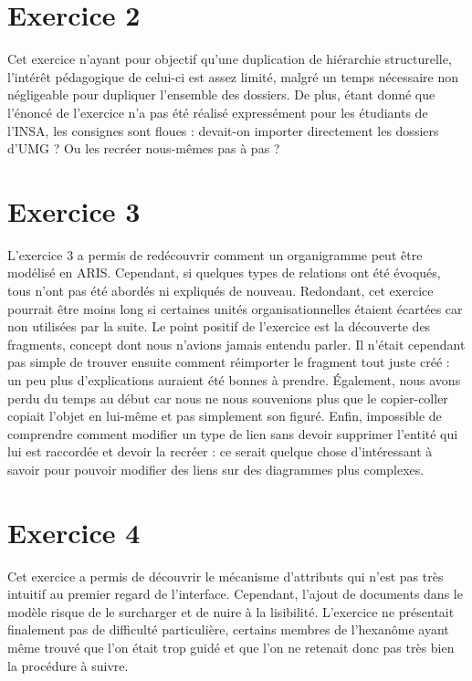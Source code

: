 \section{Exercice 2}

Cet exercice n'ayant pour objectif qu'une duplication de hiérarchie structurelle, l'intérêt pédagogique de celui-ci est assez limité, malgré un temps nécessaire non négligeable pour dupliquer l'ensemble des dossiers. De plus, étant donné que l'énoncé de l'exercice n'a pas été réalisé expressément pour les étudiants de l'INSA, les consignes sont floues : devait-on importer directement les dossiers d'UMG ? Ou les recréer nous-mêmes pas à pas ?

\section{Exercice 3}

L'exercice 3 a permis de redécouvrir comment un organigramme peut être modélisé en ARIS. Cependant, si quelques types de relations ont été évoqués, tous n'ont pas été abordés ni expliqués de nouveau. Redondant, cet exercice pourrait être moins long si certaines unités organisationnelles étaient écartées car non utilisées par la suite. Le point positif de l'exercice est la découverte des \og{}fragments\fg{}, concept dont nous n'avions jamais entendu parler. Il n'était cependant pas simple de trouver ensuite comment réimporter le fragment tout juste créé : un peu plus d’explications auraient été bonnes à prendre. \'Egalement, nous avons perdu du temps au début car nous ne nous souvenions plus que le copier-coller copiait l'objet en lui-même et pas simplement son figuré. Enfin, impossible de comprendre comment modifier un type de lien sans devoir supprimer l'entité qui lui est raccordée et devoir la recréer : ce serait quelque chose d'intéressant à savoir pour pouvoir modifier des liens sur des diagrammes plus complexes.

\section{Exercice 4}

Cet exercice a permis de découvrir le mécanisme d’attributs qui n'est pas très intuitif au premier regard de l'interface. Cependant, l'ajout de documents dans le modèle risque de le surcharger et de nuire à la lisibilité. L'exercice ne présentait finalement pas de difficulté particulière, certains membres de l'hexanôme ayant même trouvé que l'on était trop guidé et que l'on ne retenait donc pas très bien la procédure à suivre.

